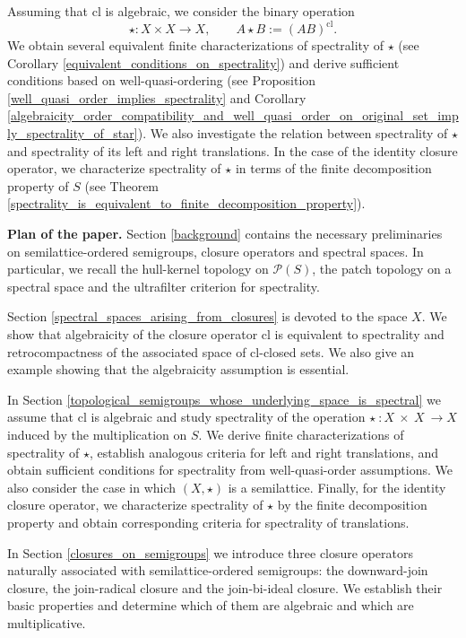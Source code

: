 \documentclass[10pt, reqno]{amsart}
\theoremstyle{plain}
\theoremstyle{definition}
\begin{document}
Assuming that $\mathrm{cl}$ is algebraic, we consider the binary operation $$\star: X \times X \to X, \qquad A\star B := (AB)^\mathrm{cl}.$$ We obtain several equivalent finite characterizations of spectrality of $\star$ (see Corollary \ref{equivalent_conditions_on_spectrality}) and derive sufficient conditions based on well-quasi-ordering (see Proposition \ref{well_quasi_order_implies_spectrality} and Corollary \ref{algebraicity_order_compatibility_and_well_quasi_order_on_original_set_imply_spectrality_of_star}). We also investigate the relation between spectrality of $\star$ and spectrality of its left and right translations. In the case of the identity closure operator, we characterize spectrality of $\star$ in terms of the finite decomposition property of $S$ (see Theorem \ref{spectrality_is_equivalent_to_finite_decomposition_property}). 

\medskip 
\noindent\textbf{Plan of the paper.} Section \ref{background} contains the necessary preliminaries on semilattice-ordered semigroups, closure operators and spectral spaces. In particular, we recall the hull-kernel topology on $\mathcal{P}(S)$, the patch topology on a spectral space and the ultrafilter criterion for spectrality. 

Section \ref{spectral_spaces_arising_from_closures} is devoted to the space $X$. We show that algebraicity of the closure operator $\mathrm{cl}$ is equivalent to spectrality and retrocompactness of the associated space of $\mathrm{cl}$-closed sets. We also give an example showing that the algebraicity assumption is essential. 

In Section \ref{topological_semigroups_whose_underlying_space_is_spectral} we assume that $\mathrm{cl}$ is algebraic and study spectrality of the operation $\star~: X~\times~X~\rightarrow X$ induced by the multiplication on $S$. We derive finite characterizations of spectrality of $\star$, establish analogous criteria for left and right translations, and obtain sufficient conditions for spectrality from well-quasi-order assumptions. We also consider the case in which $(X, \star)$ is a semilattice. Finally, for the identity closure operator, we characterize spectrality of $\star$ by the finite decomposition property and obtain corresponding criteria for spectrality of translations. 

In Section \ref{closures_on_semigroups} we introduce three closure operators naturally associated with semilattice-ordered semigroups: the downward-join closure, the join-radical closure and the join-bi-ideal closure. We establish their basic properties and determine which of them are algebraic and which are multiplicative.
\end{document}
